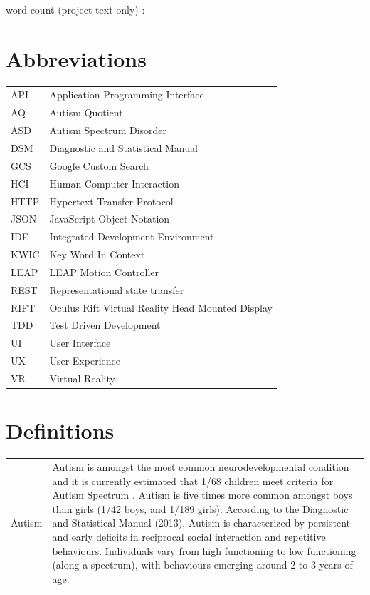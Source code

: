 \documentclass[a4paper, 11pt]{article}
\begin{document}
\begin{center}
word count (project text only) :
\end{center}

\clearpage
\tableofcontents
\clearpage

\section*{Abbreviations}
\begin{tabular}{l l }
API & Application Programming Interface\\
AQ & Autism Quotient\\
ASD & Autism Spectrum Disorder\\
DSM & Diagnostic and Statistical Manual\\
GCS & Google Custom Search\\
HCI & Human Computer Interaction\\
HTTP & Hypertext Transfer Protocol\\
JSON & JavaScript Object Notation\\
IDE & Integrated Development Environment\\
KWIC & Key Word In Context\\
LEAP & LEAP Motion Controller\\
REST & Representational state transfer\\
RIFT & Oculus Rift Virtual Reality Head Mounted Display\\
TDD & Test Driven Development\\
UI & User Interface\\
UX & User Experience\\
VR & Virtual Reality\\
\end{tabular}

\section*{Definitions}

\begin{tabular}{l p{15cm}  }
Autism & Autism is amongst the most common neurodevelopmental condition and it is currently estimated that 1/68 children meet criteria for Autism Spectrum \cite{CDC}. Autism is five times more common amongst boys than girls (1/42 boys, and 1/189 girls). According to the Diagnostic and Statistical Manual (2013), Autism is characterized by persistent and early deficits in reciprocal social interaction and repetitive behaviours. Individuals vary from high functioning to low functioning (along a spectrum), with behaviours emerging around 2 to 3 years of age.
\end{tabular}
\end{document}
